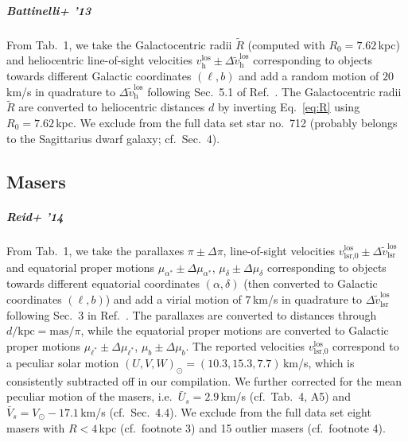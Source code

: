 \documentclass[twocolumn,prd,reprint,preprintnumbers,amsmath,amssymb,superscriptaddress,nofootinbib]{revtex4}
\begin{document}
\subparagraph{Battinelli+ '13 \cite{Battinelli2013}} From Tab.~1, we take the Galactocentric radii $\tilde{R}$ (computed with $R_0=7.62\,$kpc) and heliocentric line-of-sight velocities $v_{\textrm{h}}^{\textrm{los}}\pm \Delta \tilde{v}_{\textrm{h}}^{\textrm{los}}$ corresponding to objects towards different Galactic coordinates $(\ell,b)$ and add a random motion of $20\,$km/s in quadrature to $\Delta \tilde{v}_{\textrm{h}}^{\textrm{los}}$ following Sec.~5.1 of Ref.~\cite{DemersBattinelli2007}. The Galactocentric radii $\tilde{R}$ are converted to heliocentric distances $d$ by inverting Eq.~\eqref{eq:R} using $R_0=7.62\,$kpc. We exclude from the full data set star no.~712 (probably belongs to the Sagittarius dwarf galaxy; cf.~Sec.~4).



\subsection{Masers}

\subparagraph{Reid+ '14 \cite{Reid2014}} From Tab.~1, we take the parallaxes $\pi\pm \Delta \pi$, line-of-sight velocities $v_{\textrm{lsr,0}}^{\textrm{los}}\pm \Delta \tilde{v}_{\textrm{lsr}}^{\textrm{los}}$ and equatorial proper motions $\mu_{\alpha^\ast}\pm \Delta \mu_{\alpha^\ast}$, $\mu_\delta\pm \Delta \mu_\delta$ corresponding to objects towards different equatorial coordinates $(\alpha,\delta)$ (then converted to Galactic coordinates $(\ell,b)$) and add a virial motion of $7\,$km/s in quadrature to $\Delta \tilde{v}_{\textrm{lsr}}^{\textrm{los}}$ following Sec.~3 in Ref.~\cite{Reid2009}. The parallaxes are converted to distances through $d/\textrm{kpc}=\textrm{mas}/\pi$, while the equatorial proper motions are converted to Galactic proper motions $\mu_{\ell^\ast}\pm \Delta \mu_{\ell^\ast}$, $\mu_b\pm \Delta \mu_b$. The reported velocities $v_{\textrm{lsr,0}}^{\textrm{los}}$ correspond to a peculiar solar motion $(U,V,W)_{\odot}=(10.3,15.3,7.7)\,$km/s, which is consistently subtracted off in our compilation. We further corrected for the mean peculiar motion of the masers, i.e.~$\bar{U}_s=2.9\,$km/s (cf.~Tab.~4, A5) and $\bar{V}_s=V_\odot-17.1\,$km/s (cf.~Sec.~4.4). We exclude from the full data set eight masers with $R<4\,$kpc (cf.~footnote 3) and 15 outlier masers (cf.~footnote 4).
\end{document}
